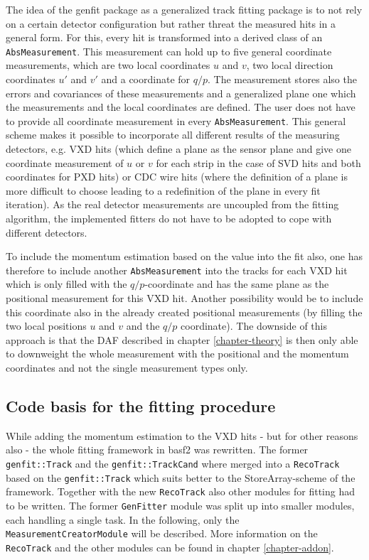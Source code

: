 The idea of the genfit package as a generalized track fitting package is to not rely on a certain detector configuration but rather threat the measured hits in a general form. For this, every hit is transformed into a derived class of an \texttt{AbsMeasurement}. This measurement can hold up to five general coordinate measurements, which are two local coordinates $u$ and $v$, two local direction coordinates $u'$ and $v'$ and a coordinate for $q/p$. The measurement stores also the errors and covariances of these measurements and a generalized plane one which the measurements and the local coordinates are defined. The user does not have to provide all coordinate measurement in every \texttt{AbsMeasurement}. This general scheme makes it possible to incorporate all different results of the measuring detectors, e.g. VXD hits (which define a plane as the sensor plane and give one coordinate measurement of $u$ or $v$ for each strip in the case of SVD hits and both coordinates for PXD hits) or CDC wire hits (where the definition of a plane is more difficult to choose leading to a redefinition of the plane in every fit iteration). As the real detector measurements are uncoupled from the fitting algorithm, the implemented fitters do not have to be adopted to cope with different detectors.

To include the momentum estimation based on the \dedx value into the fit also, one has therefore to include another \texttt{AbsMeasurement} into the tracks for each VXD hit which is only filled with the $q/p$-coordinate and has the same plane as the positional measurement for this VXD hit. Another possibility would be to include this coordinate also in the already created positional measurements (by filling the two local positions $u$ and $v$ and the $q/p$ coordinate). The downside of this approach is that the DAF described in chapter \ref{chapter-theory} is then only able to downweight the whole measurement with the positional and the momentum coordinates and not the single measurement types only.

\subsection{Code basis for the fitting procedure}

While adding the momentum estimation to the VXD hits - but for other reasons also - the whole fitting framework in basf2 was rewritten. The former \texttt{genfit::Track} and the \texttt{genfit::TrackCand} where merged into a \texttt{RecoTrack} based on the \texttt{genfit::Track} which suits better to the StoreArray-scheme of the framework. Together with the new \texttt{RecoTrack} also other modules for fitting had to be written. The former \texttt{GenFitter} module was split up into smaller modules, each handling a single task. In the following, only the \texttt{MeasurementCreatorModule} will be described. More information on the \texttt{RecoTrack} and the other modules can be found in chapter \ref{chapter-addon}.

